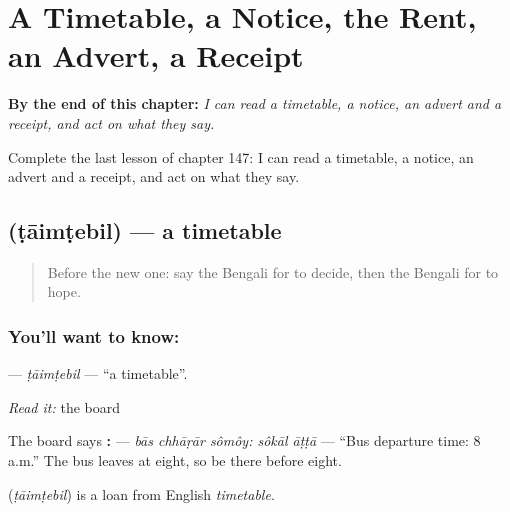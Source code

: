 
\chapter{A Timetable, a Notice, the Rent, an Advert, a Receipt}
\label{ch:bn-a-timetable-a-notice-the-rent-an-advert-a-receipt}

\begin{chapteropening}
\textbf{By the end of this chapter:} \emph{I can read a timetable, a notice, an advert and a receipt, and act on what they say.}

Complete the last lesson of chapter 147: I can read a timetable, a notice, an advert and a receipt, and act on what they say.
\end{chapteropening}

\section[\texorpdfstring{\bn{টাইমটেবিল} (ṭāimṭebil)}{টাইমটেবিল (ṭāimṭebil)}]{ (ṭāimṭebil) — a timetable}

\label{lesson:BN-C147-taimtebil}



\begin{quote}
Before the new one: say the Bengali for to decide, then the Bengali for to hope.
\end{quote}

\subsection*{You'll want to know: }
\textbf{} — \emph{ṭāimṭebil} — \textquotedblleft{}a timetable\textquotedblright{}.

\emph{Read it:} the board

The board says \textbf{  :  } — \emph{bās chhāṛār sômôy: sôkāl āṭṭā} — \textquotedblleft{}Bus departure time: 8 a.m.\textquotedblright{} The bus leaves at eight, so be there before eight.

\begin{cousinweb}
\textbf{} (\emph{ṭāimṭebil}) is a loan from English \emph{timetable}.
\end{cousinweb}

